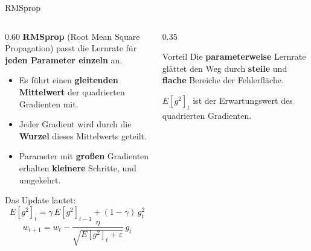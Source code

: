 \begin{frame}{RMSprop}
  \footnotesize
\begin{columns}
\begin{column}{0.60\textwidth}
\textbf{RMSprop} (Root Mean Square Propagation) passt die Lernrate für \textbf{jeden Parameter einzeln} an.
\begin{itemize}
\item Es führt einen \textbf{gleitenden Mittelwert} der quadrierten Gradienten mit.
\item Jeder Gradient wird durch die \textbf{Wurzel} dieses Mittelwerts geteilt.
\item Parameter mit \textbf{großen} Gradienten erhalten \textbf{kleinere} Schritte, und umgekehrt.
\end{itemize}
Das Update lautet:
\[
E[g^2]_t = \gamma\, E[g^2]_{t-1} + (1-\gamma)\, g_t^2
\]
\[
w_{t+1} = w_t - \frac{\eta}{\sqrt{E[g^2]_t + \varepsilon}}\, g_t
\]
\end{column}
\begin{column}{0.35\textwidth}
\begin{block}{\footnotesize Vorteil}
Die \textbf{parameterweise} Lernrate glättet den Weg durch \textbf{steile} und \textbf{flache} Bereiche der Fehlerfläche.
\end{block}
\par\medskip
$E[g^2]_t$ ist der Erwartungswert des quadrierten Gradienten. 

\end{column}
\end{columns}
\end{frame}

